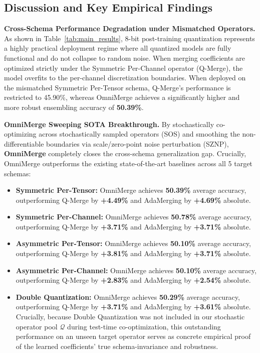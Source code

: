 \subsection{Discussion and Key Empirical Findings}

\textbf{Cross-Schema Performance Degradation under Mismatched Operators.}
As shown in Table~\ref{tab:main_results}, 8-bit post-training quantization represents a highly practical deployment regime where all quantized models are fully functional and do not collapse to random noise. When merging coefficients are optimized strictly under the Symmetric Per-Channel operator (Q-Merge), the model overfits to the per-channel discretization boundaries. When deployed on the mismatched Symmetric Per-Tensor schema, Q-Merge's performance is restricted to 45.90\%, whereas OmniMerge achieves a significantly higher and more robust ensembling accuracy of \textbf{50.39\%}.

\textbf{OmniMerge Sweeping SOTA Breakthrough.}
By stochastically co-optimizing across stochastically sampled operators (SOS) and smoothing the non-differentiable boundaries via scale/zero-point noise perturbation (SZNP), \textbf{OmniMerge} completely closes the cross-schema generalization gap. Crucially, OmniMerge outperforms the existing state-of-the-art baselines across all 5 target schemas:
\begin{itemize}
    \item \textbf{Symmetric Per-Tensor:} OmniMerge achieves \textbf{50.39\%} average accuracy, outperforming Q-Merge by \textbf{+4.49\%} and AdaMerging by \textbf{+4.69\%} absolute.
    \item \textbf{Symmetric Per-Channel:} OmniMerge achieves \textbf{50.78\%} average accuracy, outperforming Q-Merge by \textbf{+3.71\%} and AdaMerging by \textbf{+3.71\%} absolute.
    \item \textbf{Asymmetric Per-Tensor:} OmniMerge achieves \textbf{50.10\%} average accuracy, outperforming Q-Merge by \textbf{+3.81\%} and AdaMerging by \textbf{+3.71\%} absolute.
    \item \textbf{Asymmetric Per-Channel:} OmniMerge achieves \textbf{50.10\%} average accuracy, outperforming Q-Merge by \textbf{+2.83\%} and AdaMerging by \textbf{+2.54\%} absolute.
    \item \textbf{Double Quantization:} OmniMerge achieves \textbf{50.29\%} average accuracy, outperforming Q-Merge by \textbf{+3.71\%} and AdaMerging by \textbf{+3.61\%} absolute. Crucially, because Double Quantization was not included in our stochastic operator pool $\mathcal{Q}$ during test-time co-optimization, this outstanding performance on an unseen target operator serves as concrete empirical proof of the learned coefficients' true schema-invariance and robustness.
\end{itemize}

